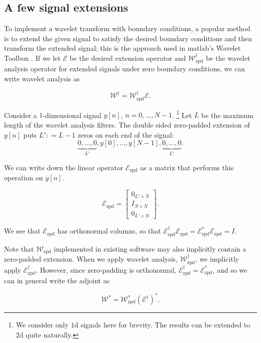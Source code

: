 \documentclass[journal]{IEEEtran}
\newcommand{\defeq}{\mathrel{\mathop:}=}
\begin{document}
\subsection{A few signal extensions}
To implement a wavelet transform with boundary conditions, a popular method is to extend the given signal to satisfy the desired boundary conditions and then transform the extended signal; this is the approach used in {\sc matlab}'s Wavelet Toolbox \cite{matlab_wt_2015}.  If we let $\mathcal{E}$ be the desired extension operator and $\mathcal{W}^\dagger_\text{zpd}$ be the wavelet analysis operator for extended signals under zero boundary conditions, we can write wavelet analysis as 

\[ \mathcal{W}^\dagger = \mathcal{W}^\dagger_\text{zpd}\mathcal{E}. \] 

Consider a $1$-dimensional signal $y[n]$, $n=0,...,N-1$.  \footnote{We consider only $1$d signals here for brevity.  The results can be extended to 2d quite naturally.}  Let $L$ be the maximum length of the wavelet analysis filters.  The double sided zero-padded extension of $y[n]$ puts $L'\defeq L-1$ zeros on each end of the signal:
\[ \underbrace{0, ..., 0}_{L'}, y[0], ..., y[N-1], \underbrace{0, ..., 0}_{L'}. \]

\noindent We can write down the linear operator $\mathcal{E}_\text{zpd}$ as a matrix that performs this operation on $y[n]$.

\[ \mathcal{E}_\text{zpd} = \begin{bmatrix} 0_{L'\times N}\\ I_{N\times N}\\ 0_{L'\times N}\end{bmatrix}. \] 

   \noindent We see that $\mathcal{E}_\text{zpd}$ has orthonormal columns, so that ${\mathcal{E}_\text{zpd}^\dagger\mathcal{E}_\text{zpd} = \mathcal{E}_\text{zpd}^\ast\mathcal{E}_\text{zpd}=I}$.

   Note that $\mathcal{W}_\text{zpd}$ implemented in existing software may also implicitly contain a zero-padded extension.  When we apply wavelet analysis, $\mathcal{W}_\text{zpd}^\dagger$, we implicitly apply $\mathcal{E}_\text{zpd}^\dagger$.  However, since zero-padding is orthonormal, $\mathcal{E}_\text{zpd}^\dagger=\mathcal{E}_\text{zpd}^\ast$, and so we can in general write the adjoint as 

\begin{equation}
\label{eq:wzpd_adjoint}
\mathcal{W}^\ast = \mathcal{W}_\text{zpd}^\ast\left(\mathcal{E}^\dagger\right)^\ast.
\end{equation}
\end{document}
